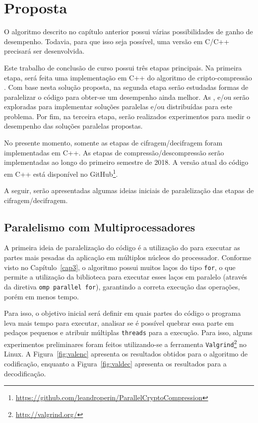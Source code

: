 \chapter{Proposta}
\label{cap4}

O algoritmo descrito no capítulo anterior possui várias possibilidades de ganho de desempenho. Todavia, para que isso seja possível, uma versão em C/C++ precisará ser desenvolvida.

Este trabalho de conclusão de curso possui três etapas principais. Na primeira etapa, será feita uma implementação em C++ do algoritmo de cripto-compressão \gmpr. Com base nesta solução proposta, na segunda etapa serão estudadas formas de paralelizar o código para obter-se um desempenho ainda melhor. As \apis \openMP, \mpi e/ou \cuda serão exploradas para implementar soluções paralelas e/ou distribuídas para este problema. Por fim, na terceira etapa, serão realizados experimentos para medir o desempenho das soluções paralelas propostas.

No presente momento, somente as etapas de cifragem/decifragem foram implementadas em C++. As etapas de compressão/descompressão serão implementadas ao longo do primeiro semestre de 2018. A versão atual do código em C++ está disponível no GitHub\footnote{\url{https://github.com/leandroperin/ParallelCryptoCompression}}.

A seguir, serão apresentadas algumas ideias iniciais de paralelização das etapas de cifragem/decifragem.

\section{Paralelismo com Multiprocessadores}

A primeira ideia de paralelização do código é a utilização do \openMP para executar as partes mais pesadas da aplicação em múltiplos núcleos do processador. Conforme visto no Capítulo~\ref{cap3}, o algoritmo possui muitos laços do tipo \texttt{for}, o que permite a utilização da biblioteca \openMP para executar esses laços em paralelo (através da diretiva \texttt{omp parallel for}), garantindo a correta execução das operações, porém em menos tempo.

Para isso, o objetivo inicial será definir em quais partes do código o programa leva mais tempo para executar, analisar se é possível quebrar essa parte em pedaços pequenos e atribuir múltiplas \texttt{threads} para a execução. Para isso, alguns experimentos preliminares foram feitos utilizando-se a ferramenta \texttt{Valgrind}\footnote{\url{http://valgrind.org/}} no Linux. A Figura~\ref{fig:valenc} apresenta os resultados obtidos para o algoritmo de codificação, enquanto a Figura~\ref{fig:valdec} apresenta os resultados para a decodificação.

